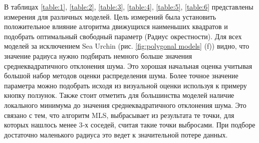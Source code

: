 В таблицах \ref{table:1}, \ref{table:2}, \ref{table:3}, \ref{table:4}, \ref{table:5}, \ref{table:6} представлены измерения для различных моделей. Цель измерений была установить положительное влияние алгоритма движущихся наименьших квадратов и  подобрать оптимальный свободный параметр (Радиус окрестности). Для всех моделей за исключением Sea Urchin (рис. \ref{fig:polygonal models} (f)) видно, что значение радиуса нужно подбирать немного больше значения среднеквадратичного отклонения шума. Это хорошая начальная оценка учитывая большой набор методов оценки распределения шума. Более точное значение параметра можно подобрать исходя из визуальной оценки используя к примеру кнопку ползунок.  Также стоит отметить для большинства моделей наличие локального минимума до значения среднеквадратичного отклонения шума. Это связано с тем, что алгоритм MLS, выбрасывает из результата те точки, для которых нашлось менее 3‑х соседей, считая такие точки выбросами. При подборе достаточно маленького радиуса это ведет к значительной потере данных.
